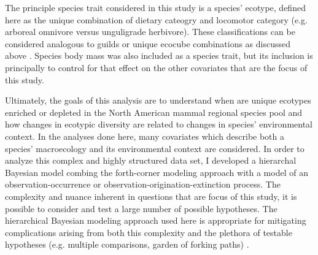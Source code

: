 \documentclass[12pt,letterpaper]{article}
\begin{document}
The principle species trait considered in this study is a species' ecotype, defined here as the unique combination of dietary cateogry and locomotor category (e.g. arboreal omnivore versus unguligrade herbivore). These classifications can be considered analogous to guilds or unique ecocube combinations as discussed above \citep{Bush2007,Bambach2007,Bush2011}. Species body mass was also included as a species trait, but its inclusion is principally to control for that effect on the other covariates that are the focus of this study.


Ultimately, the goals of this analysis are to understand when are unique ecotypes enriched or depleted in the North American mammal regional species pool and how changes in ecotypic diversity are related to changes in species' environmental context. In the analyses done here, many covariates which describe both a species' macroecology and its environmental context are considered. In order to analyze this complex and highly structured data set, I developed a hierarchal Bayesian model combing the forth-corner modeling approach with a model of an observation-occurrence or observation-origination-extinction process. The complexity and nuance inherent in questions that are focus of this study, it is possible to consider and test a large number of possible hypotheses. The hierarchical Bayesian modeling approach used here is appropriate for mitigating complications arising from both this complexity and the plethora of testable hypotheses (e.g. multiple comparisons, garden of forking paths) \citep{Gelman2013d,Gelman2012a,Gelman2014}.
\end{document}
